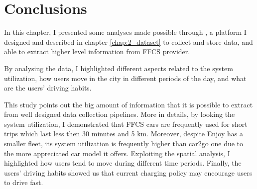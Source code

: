 \section{Conclusions}
\label{sec:3_conclusion}

In this chapter, I presented some analyses made possible through \tool, a platform I designed and described in chapter \ref{chap:2_dataset} to collect and store data, and able to extract higher level information from FFCS provider.

By analysing the data, I highlighted different aspects related to the system utilization, how users move in the city in different periods of the day, and what are the users' driving habits.

This study points out the big amount of information that it is possible to extract from well designed data collection pipelines. More in details, by looking the system utilization, I demonstrated that FFCS cars are frequently used for short trips which last less then 30 minutes and 5 km. Moreover, despite Enjoy has a smaller fleet, its system utilization is frequently higher than car2go one due to the more appreciated car model it offers. Exploiting the spatial analysis, I highlighted how users tend to move during different time periods. Finally, the users' driving habits showed us that current charging policy may encourage users to drive fast. 

